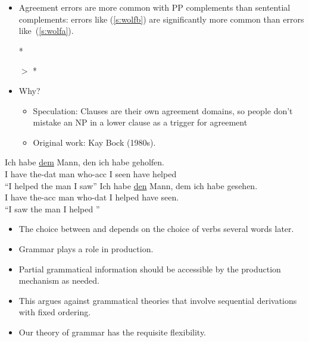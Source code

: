 \documentclass[a4paper,landscape,headrule,footrule]{foils}
\begin{document}

\begin{itemize}
\item Agreement errors are more common with PP complements than
  sentential complements: errors like (\ref{s:wolfb}) are
  significantly more common than errors like~(\ref{s:wolfa}).
  \begin{exe}
    \ex\label{s:wolfa} *
    
    \ex\label{s:wolfb}  $>$ *
  \end{exe}
\item Why?
  \begin{itemize}
  \item Speculation: Clauses are their own 
    agreement domains, so people don’t 
    mistake an NP in a lower clause as a trigger 
    for agreement
  \item Original work: Kay Bock (1980s).
  \end{itemize}
\end{itemize}


\begin{exe}
\item\gll Ich habe   \ul{dem}  Mann,  den    ich  habe geholfen. \\
I   have  the-dat man who-acc I   seen      have   helped\\
\trans    “I helped the man I saw”
\ex \gll Ich habe   \ul{den}   Mann,  dem    ich  habe gesehen.\\
    I   have the-acc man  who-dat I    helped    have   seen.\\
\trans    “I saw the man I helped ”
\end{exe}
\begin{itemize}
\item The choice between  and  depends on the choice of 
  verbs several words later.
\end{itemize}



\begin{itemize}
\item Grammar plays a role in production.
\item Partial grammatical information should be accessible by 
the production mechanism as needed.
\item This argues against grammatical theories that involve 
sequential derivations with fixed ordering.
\item Our theory of grammar has the requisite flexibility.
\end{itemize}
\end{document}
